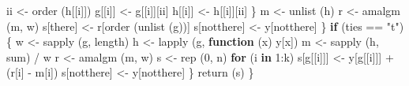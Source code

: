 \documentclass[
  12pt,
]{book}
\newenvironment{Shaded}{\begin{snugshade}}{\end{snugshade}}
\newcommand{\ControlFlowTok}[1]{\textcolor[rgb]{0.13,0.29,0.53}{\textbf{#1}}}
\newcommand{\DecValTok}[1]{\textcolor[rgb]{0.00,0.00,0.81}{#1}}
\newcommand{\FunctionTok}[1]{\textcolor[rgb]{0.00,0.00,0.00}{#1}}
\newcommand{\NormalTok}[1]{#1}
\newcommand{\OtherTok}[1]{\textcolor[rgb]{0.56,0.35,0.01}{#1}}
\newcommand{\SpecialCharTok}[1]{\textcolor[rgb]{0.00,0.00,0.00}{#1}}
\newcommand{\StringTok}[1]{\textcolor[rgb]{0.31,0.60,0.02}{#1}}
\begin{document}
\begin{Shaded}
\begin{Highlighting}[]
\NormalTok{        ii }\OtherTok{\textless{}{-}} \FunctionTok{order}\NormalTok{ (h[[i]])}
\NormalTok{        g[[i]] }\OtherTok{\textless{}{-}}\NormalTok{ g[[i]][ii]}
\NormalTok{        h[[i]] }\OtherTok{\textless{}{-}}\NormalTok{ h[[i]][ii]}
\NormalTok{      \}}
\NormalTok{      m }\OtherTok{\textless{}{-}} \FunctionTok{unlist}\NormalTok{ (h)}
\NormalTok{      r }\OtherTok{\textless{}{-}} \FunctionTok{amalgm}\NormalTok{ (m, w)}
\NormalTok{      s[there] }\OtherTok{\textless{}{-}}\NormalTok{ r[}\FunctionTok{order}\NormalTok{ (}\FunctionTok{unlist}\NormalTok{ (g))]}
\NormalTok{      s[notthere] }\OtherTok{\textless{}{-}}\NormalTok{ y[notthere]}
\NormalTok{    \}}
    \ControlFlowTok{if}\NormalTok{ (ties }\SpecialCharTok{==} \StringTok{"t"}\NormalTok{) \{}
\NormalTok{      w }\OtherTok{\textless{}{-}} \FunctionTok{sapply}\NormalTok{ (g, length)}
\NormalTok{      h }\OtherTok{\textless{}{-}} \FunctionTok{lapply}\NormalTok{ (g, }\ControlFlowTok{function}\NormalTok{ (x)}
\NormalTok{        y[x])}
\NormalTok{      m }\OtherTok{\textless{}{-}} \FunctionTok{sapply}\NormalTok{ (h, sum) }\SpecialCharTok{/}\NormalTok{ w}
\NormalTok{      r }\OtherTok{\textless{}{-}} \FunctionTok{amalgm}\NormalTok{ (m, w)}
\NormalTok{      s }\OtherTok{\textless{}{-}} \FunctionTok{rep}\NormalTok{ (}\DecValTok{0}\NormalTok{, n)}
      \ControlFlowTok{for}\NormalTok{ (i }\ControlFlowTok{in} \DecValTok{1}\SpecialCharTok{:}\NormalTok{k)}
\NormalTok{        s[g[[i]]] }\OtherTok{\textless{}{-}}\NormalTok{ y[g[[i]]] }\SpecialCharTok{+}\NormalTok{ (r[i] }\SpecialCharTok{{-}}\NormalTok{ m[i])}
\NormalTok{      s[notthere] }\OtherTok{\textless{}{-}}\NormalTok{ y[notthere]}
\NormalTok{    \}}
    \FunctionTok{return}\NormalTok{ (s)}
\NormalTok{  \}}


\end{Highlighting}
\end{Shaded}
\end{document}
